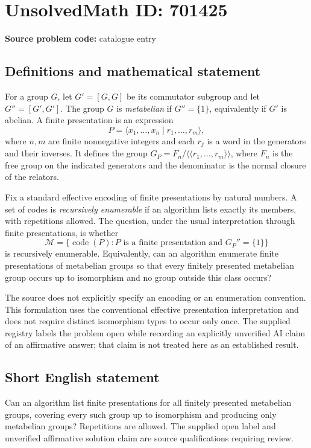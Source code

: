 \documentclass[11pt]{article}
\begin{document}
\section*{UnsolvedMath ID: 701425}
\textbf{Source problem code:} catalogue entry
\subsection{Definitions and mathematical statement}
For a group \(G\), let \(G'=[G,G]\) be its commutator subgroup and let \(G''=[G',G']\). The group \(G\) is \emph{metabelian} if \(G''=\{1\}\), equivalently if \(G'\) is abelian. A finite presentation is an expression
\[
P=\langle x_1,\ldots,x_n\mid r_1,\ldots,r_m\rangle,
\]
where \(n,m\) are finite nonnegative integers and each \(r_j\) is a word in the generators and their inverses. It defines the group \(G_P=F_n/\langle\!\langle r_1,\ldots,r_m\rangle\!\rangle\), where \(F_n\) is the free group on the indicated generators and the denominator is the normal closure of the relators.

Fix a standard effective encoding of finite presentations by natural numbers. A set of codes is \emph{recursively enumerable} if an algorithm lists exactly its members, with repetitions allowed. The question, under the usual interpretation through finite presentations, is whether
\[
\mathcal M=\{\operatorname{code}(P): P\text{ is a finite presentation and }G_P''=\{1\}\}
\]
is recursively enumerable. Equivalently, can an algorithm enumerate finite presentations of metabelian groups so that every finitely presented metabelian group occurs up to isomorphism and no group outside this class occurs?

The source does not explicitly specify an encoding or an enumeration convention. This formulation uses the conventional effective presentation interpretation and does not require distinct isomorphism types to occur only once. The supplied registry labels the problem open while recording an explicitly unverified AI claim of an affirmative answer; that claim is not treated here as an established result.
\subsection{Short English statement}
Can an algorithm list finite presentations for all finitely presented metabelian groups, covering every such group up to isomorphism and producing only metabelian groups? Repetitions are allowed. The supplied open label and unverified affirmative solution claim are source qualifications requiring review.
\end{document}
